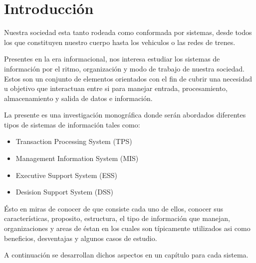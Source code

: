 \chapter{Introducción}

Nuestra sociedad esta tanto rodeada como conformada por sistemas, desde todos los que constituyen nuestro cuerpo hasta los vehiculos o las redes de trenes. 

Presentes en la era informacional, nos interesa estudiar los sistemas de información por el ritmo, organización y modo de trabajo de nuestra sociedad. Estos son un conjunto de elementos orientados con el fin de cubrir una necesidad u objetivo que interactuan entre si para manejar entrada, procesamiento, almacenamiento y salida de datos e información.

La presente es una investigación monográfica donde serán abordados diferentes tipos de sistemas de información tales como: 
\begin{itemize}
\item Transaction Processing System (TPS)
\item Management Information System (MIS)
\item Executive Support System (ESS) 
\item Desision Support System (DSS) 
\end{itemize}

Ésto en miras de conocer de que consiste cada uno de ellos, conocer sus características, proposito, estructura, el tipo de información que manejan, organizaciones y areas de éstan en los cuales son típicamente utilizados asi como beneficios, desventajas y algunos casos de estudio.

A continuación se desarrollan dichos aspectos en un capítulo para cada sistema.

